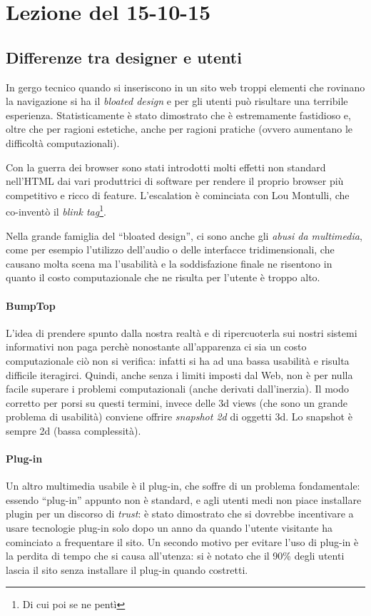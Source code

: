\section{Lezione del 15-10-15}

\subsection{Differenze tra designer e utenti}

In gergo tecnico quando si inseriscono in un sito web troppi elementi che rovinano la navigazione si ha il \textit{bloated design} e per gli utenti pu\`o risultare una terribile esperienza. Statisticamente \`e stato dimostrato che \`e estremamente fastidioso e, oltre che per ragioni estetiche, anche per ragioni pratiche (ovvero aumentano le difficolt\`a computazionali).

Con la guerra dei browser sono stati introdotti molti effetti non standard nell'HTML dai vari produttrici di software per rendere il proprio browser pi\`u competitivo e ricco di feature. L'escalation \`e cominciata con Lou Montulli, che co-invent\`o il \textit{blink tag}\footnote{Di cui poi se ne pent\`i}.

Nella grande famiglia del ``bloated design'', ci sono anche gli \textit{abusi da multimedia}, come per esempio l'utilizzo dell'audio o delle interfacce tridimensionali, che causano molta scena ma l'usabilit\`a e la soddisfazione finale ne risentono in quanto il costo computazionale che ne risulta per l'utente \`e troppo alto.

\paragraph*{BumpTop} L'idea di prendere spunto dalla nostra realt\`a e di ripercuoterla sui nostri sistemi informativi non paga perch\`e nonostante all'apparenza ci sia un costo computazionale ci\`o non si verifica: infatti si ha ad una bassa usabilit\`a e risulta difficile iteragirci. Quindi, anche senza i limiti imposti dal Web, non \`e per nulla facile superare i problemi computazionali (anche derivati dall'inerzia). Il modo corretto per porsi su questi termini, invece delle 3d views (che sono un grande problema di usabilit\`a) conviene offrire \textit{snapshot 2d} di oggetti 3d. Lo snapshot \`e sempre 2d (bassa complessit\`a).

\paragraph*{Plug-in} Un altro multimedia usabile \`e il plug-in, che soffre di un problema fondamentale: essendo ``plug-in'' appunto non \`e standard, e agli utenti medi non piace installare plugin per un discorso di \textit{trust}: \`e stato dimostrato che si dovrebbe incentivare a usare tecnologie plug-in solo dopo un anno da quando l'utente visitante ha cominciato a frequentare il sito. Un secondo motivo per evitare l'uso di plug-in \`e la perdita di tempo che si causa all'utenza: si \`e notato che il 90\% degli utenti lascia il sito senza installare il plug-in quando costretti.

